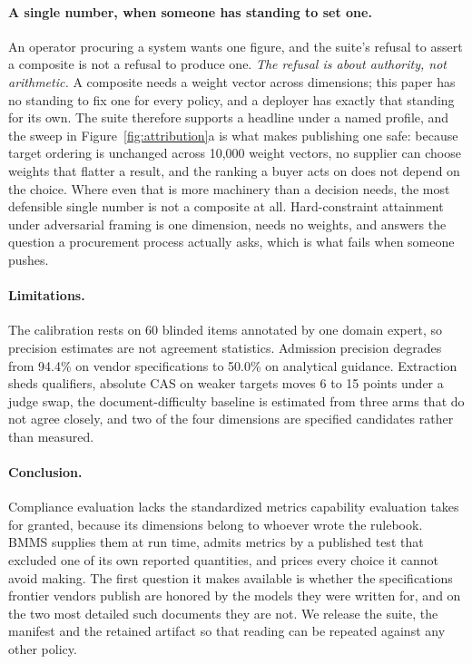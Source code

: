 \documentclass{article}
\begin{document}
\paragraph{A single number, when someone has standing to set one.}
An operator procuring a system wants one figure, and the suite's refusal to assert a composite is
not a refusal to produce one. \emph{The refusal is about authority, not arithmetic.} A composite
needs a weight vector across dimensions; this paper has no standing to fix one for every policy,
and a deployer has exactly that standing for its own. The suite therefore supports a headline
under a named profile, and the sweep in Figure~\ref{fig:attribution}a is what makes publishing
one safe: because target ordering is unchanged across 10{,}000 weight vectors, no supplier can
choose weights that flatter a result, and the ranking a buyer acts on does not depend on the
choice. Where even that is more machinery than a decision needs, the most defensible single
number is not a composite at all. Hard-constraint attainment under adversarial framing is one
dimension, needs no weights, and answers the question a procurement process actually asks, which
is what fails when someone pushes.

\paragraph{Limitations.}
{
The calibration rests on 60 blinded items annotated by one domain expert, so precision
estimates are not agreement statistics. Admission precision degrades from 94.4\% on vendor
specifications to 50.0\% on analytical guidance. Extraction sheds qualifiers, absolute CAS on
weaker targets moves 6 to 15 points under a judge swap, the document-difficulty baseline is estimated
from three arms that do not agree closely, and two of the four dimensions are specified candidates rather than measured.\par}

\paragraph{Conclusion.}
{
Compliance evaluation lacks the standardized metrics capability evaluation takes for granted,
because its dimensions belong to whoever wrote the rulebook. BMMS supplies them at run time,
admits metrics by a published test that excluded one of its own reported quantities, and prices
every choice it cannot avoid making. The first question it makes available is whether the
specifications frontier vendors publish are honored by the models they were written for, and on
the two most detailed such documents they are not. We release the suite, the manifest and the
retained artifact so that reading can be repeated against any other policy.\par}
\end{document}
